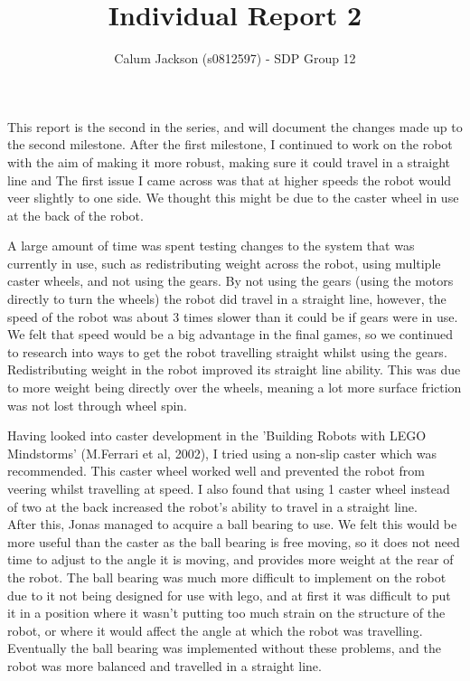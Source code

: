 \documentclass[12pt]{article}
\begin{document}
\title{Individual Report 2}
\author{Calum Jackson (s0812597) - 
SDP Group 12}
\maketitle
\begin{flushleft}

This report is the second in the series, and will document the changes made up to the second milestone. After the first milestone, I continued to work on the robot with the aim of making it more robust, making sure it could travel in a straight line and  
The first issue I came across was that at higher speeds the robot would veer slightly to one side. We thought this might be due to the caster wheel in use at the back of the robot.  \linebreak

A large amount of time was spent testing changes to the system that was currently in use, such as redistributing weight across the robot, using multiple caster wheels, and not using the gears. By not using the gears (using the motors directly to turn the wheels) the robot did travel in a straight line, however, the speed of the robot was about 3 times slower than it could be if gears were in use. We felt that speed would be a big advantage in the final games, so we continued to research into ways to get the robot travelling straight whilst using the gears.\\
Redistributing weight in the robot improved its straight line ability. This was due to more weight being directly over the wheels, meaning a lot more surface friction was not lost through wheel spin.\linebreak 

Having looked into caster development in the 'Building Robots with LEGO Mindstorms' (M.Ferrari et al, 2002), I tried using a non-slip caster which was recommended. This caster wheel worked well and prevented the robot from veering whilst travelling at speed. I also found that using 1 caster wheel instead of two at the back increased the robot's ability to travel in a straight line.\\

After this, Jonas managed to acquire a ball bearing to use. We felt this would be more useful than the caster as the ball bearing is free moving, so it does not need time to adjust to the angle it is moving, and provides more weight at the rear of the robot. The ball bearing was much more difficult to implement on the robot due to it not being designed for use with lego, and at first it was difficult to put it in a position where it wasn't putting too much strain on the structure of the robot, or where it would affect the angle at which the robot was travelling. Eventually the ball bearing was implemented without these problems, and the robot was more balanced and travelled in a straight line.\\


\end{flushleft}
\end{document}
